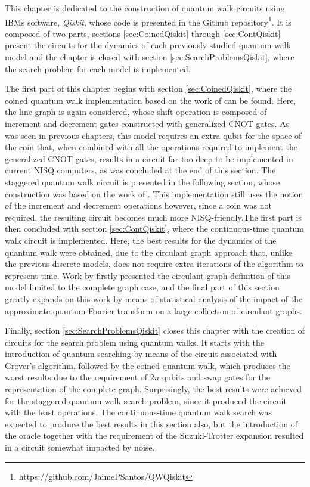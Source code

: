 \documentclass[../../dissertation.tex]{subfiles}
\begin{document}
This chapter is dedicated to the construction of quantum walk circuits using
IBMs software, \textit{Qiskit}, whose code is presented in the Github
repository\footnote{https://github.com/JaimePSantos/QWQiskit}. It is composed
of two parts, sections \ref{sec:CoinedQiskit} through \ref{sec:ContQiskit}
present the circuits for the dynamics of each previously studied quantum walk
model and the chapter is closed with section \ref{sec:SearchProblemsQiskit},
where the search problem for each model is implemented.\par 

The first part of this chapter begins with section \ref{sec:CoinedQiskit},
where the coined quantum walk implementation based on the work of
\cite{douglaswang07} can be found. Here, the line graph is again considered,
whose shift operation is composed of increment and decrement gates constructed
with generalized CNOT gates. As was seen in previous chapters, this model
requires an extra qubit for the space of the coin that, when combined with all
the operations required to implement the generalized CNOT gates, results in a
circuit far too deep to be implemented in current NISQ computers, as was
concluded at the end of this section. The staggered quantum walk circuit is
presented in the following section, whose construction was based on the work of
\cite{acasiete2020}. This implementation still uses the notion of the increment
and decrement operations however, since a coin was not required, the resulting
circuit becomes much more NISQ-friendly.The first part is then concluded with
section \ref{sec:ContQiskit}, where the continuous-time quantum walk circuit is
implemented. Here, the best results for the dynamics of the quantum walk were
obtained, due to the circulant graph approach that, unlike the previous
discrete models, does not require extra iterations of the algorithm to
represent time. Work by \cite{qiang2016} firstly presented the circulant graph
definition of this model limited to the complete graph case, and the final part
of this section greatly expands on this work by means of statistical analysis
of the impact of the approximate quantum Fourier transform on a large
collection of circulant graphs.\par

Finally, section \ref{sec:SearchProblemsQiskit} closes this chapter with the
creation of circuits for the search problem using quantum walks. It starts with
the introduction of quantum searching by means of the circuit associated with
Grover's algorithm, followed by the coined quantum walk, which produces the
worst results due to the requirement of $2n$ qubits and swap gates for the
representation of the complete graph. Surprisingly, the best results were
achieved for the staggered quantum walk search problem, since it produced the
circuit with the least operations. The continuous-time quantum walk search was
expected to produce the best results in this section also, but the introduction
of the oracle together with the requirement of the Suzuki-Trotter expansion
resulted in a circuit somewhat impacted by noise.
\end{document}
